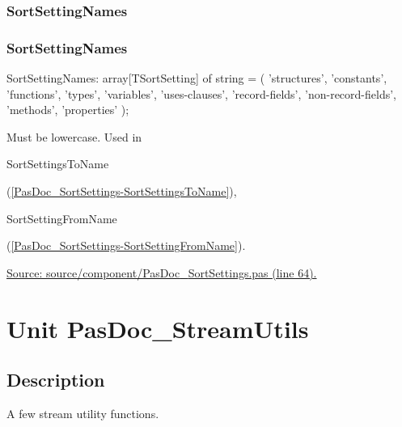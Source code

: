 \documentclass{report}
\newif\ifpdf
\begin{document}
\subsection*{\large{\textbf{SortSettingNames}}\normalsize\hspace{1ex}\hrulefill}
\else
\subsection*{SortSettingNames}
\fi
\label{PasDoc_SortSettings-SortSettingNames}
\begin{list}{}{
\setlength{\itemindent}{0cm}
\setlength{\listparindent}{0cm}
\setlength{\leftmargin}{\evensidemargin}
\addtolength{\leftmargin}{\tmplength}
\settowidth{\labelsep}{X}
\addtolength{\leftmargin}{\labelsep}
\setlength{\labelwidth}{\tmplength}
}
\item[\textbf{Declaration}\hfill]
\ifpdf
\begin{flushleft}
\fi
\begin{ttfamily}
SortSettingNames: array[TSortSetting] of string = (
    'structures', 'constants', 'functions', 'types', 'variables', 'uses-clauses',
    'record-fields', 'non-record-fields', 'methods', 'properties' );\end{ttfamily}

\ifpdf
\end{flushleft}
\fi

\par
\item[\textbf{Description}]
Must be lowercase. Used in \begin{ttfamily}SortSettingsToName\end{ttfamily}(\ref{PasDoc_SortSettings-SortSettingsToName}), \begin{ttfamily}SortSettingFromName\end{ttfamily}(\ref{PasDoc_SortSettings-SortSettingFromName}).\par
\href{https://github.com/pasdoc/pasdoc/blob/master/source/component/PasDoc_SortSettings.pas#L64}{Source: source/component/PasDoc{\_}SortSettings.pas (line 64).}

\end{list}
\chapter{Unit PasDoc{\_}StreamUtils}
\label{PasDoc_StreamUtils}
\section{Description}
A few stream utility functions.\hfill\vspace*{1ex}
\end{document}
